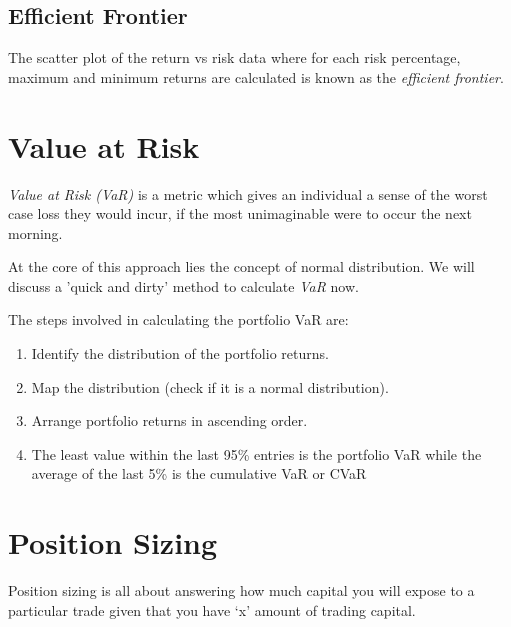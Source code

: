 
\subsection{Efficient Frontier}

The scatter plot of the return vs risk data where for each risk percentage, maximum and minimum returns are calculated is known as the \emph{efficient frontier}.

\section{Value at Risk}

\emph{Value at Risk (VaR)} is a metric which gives an individual a sense of the worst case loss they would incur, if the most unimaginable were to occur the next morning.

At the core of this approach lies the concept of normal distribution. We will discuss a 'quick and dirty' method to calculate \emph{VaR} now.

The steps involved in calculating the portfolio VaR are:
\begin{enumerate}
  \item Identify the distribution of the portfolio returns.
  \item Map the distribution (check if it is a normal distribution).
  \item Arrange portfolio returns in ascending order.
  \item The least value within the last 95\% entries is the portfolio VaR while the average of the last 5\% is the cumulative VaR or CVaR
\end{enumerate}



\section{Position Sizing}
Position sizing is all about answering how much capital you will expose to a particular trade given that you have ‘x’ amount of trading capital.


